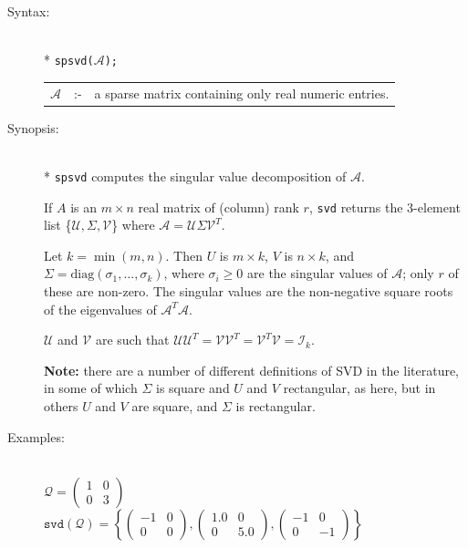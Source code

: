 \begin{description}
\item[Syntax:]\mbox{}\\*
{\tt spsvd($\mathcal{A}$);}\\[2mm]
\begin{tabular}{l l l}
$\mathcal{A}$ &:-& a sparse matrix containing only real numeric entries.
\end{tabular}

\item[Synopsis:]\mbox{}\\*
\texttt{spsvd} computes the singular value decomposition of $\mathcal{A}$.

If $A$
is an $m\times n$ real matrix of (column) rank $r$, \texttt{svd} returns the
3-element list \{$\mathcal{U},\Sigma,\mathcal{V}$\} where $\mathcal{A} =
\mathcal{U} \Sigma \mathcal{V}^T$.

Let $k=\min(m,n)$.  Then $U$ is $m\times k$,
$V$ is $n\times k$, and $\Sigma = \mbox{diag}(\sigma_{1}, \ldots ,\sigma_{k})$,
where $\sigma_{i}\ge 0$ are the singular values of $\mathcal{A}$; only $r$ of
these are non-zero.  The singular values are the non-negative square roots of
the eigenvalues of $\mathcal{A}^T \mathcal{A}$.

$\mathcal{U}$ and $\mathcal{V}$ are such that $\mathcal{UU}^T = \mathcal{VV}^T =
\mathcal{V}^T \mathcal{V} = \mathcal{I}_k$.

\textbf{Note:} there are a number of different definitions of SVD in the
literature, in some of which $\Sigma$ is square and $U$ and $V$ rectangular, as
here, but in others $U$ and $V$ are square, and $\Sigma$ is rectangular.

\item[Examples:]\mbox{}\\
 \( \mathcal{Q} = \begin{pmatrix} 1 & 0 \\ 0 & 3 \end{pmatrix}\) \\[2mm]
 \( \mathtt{svd(\mathcal{Q})} =
       \left\{
         \begin{pmatrix} -1 & 0 \\ 0 & 0 \end{pmatrix},
         \begin{pmatrix} 1.0 & 0 \\ 0 & 5.0 \end{pmatrix},
         \begin{pmatrix} -1 & 0 \\ 0 & -1 \end{pmatrix}
       \right\}\)
\end{description}

